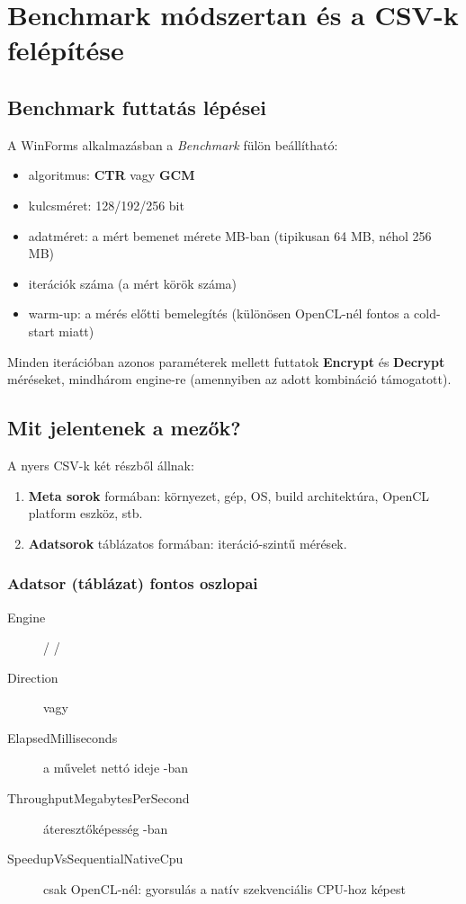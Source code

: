 \chapter{Benchmark módszertan és a CSV-k felépítése}

\section{Benchmark futtatás lépései}

A WinForms alkalmazásban a \emph{Benchmark} fülön beállítható:

\begin{itemize}
  \item algoritmus: \textbf{CTR} vagy \textbf{GCM}
  \item kulcsméret: 128/192/256 bit
  \item adatméret: a mért bemenet mérete MB-ban (tipikusan 64 MB, néhol 256 MB)
  \item iterációk száma (a mért körök száma)
  \item warm-up: a mérés előtti bemelegítés (különösen OpenCL-nél fontos a cold-start miatt)
\end{itemize}

Minden iterációban azonos paraméterek mellett futtatok \textbf{Encrypt} és \textbf{Decrypt} méréseket,
mindhárom engine-re (amennyiben az adott kombináció támogatott).

\section{Mit jelentenek a mezők?}

A nyers CSV-k két részből állnak:

\begin{enumerate}
  \item \textbf{Meta sorok}  formában:
    környezet, gép, OS, build architektúra, OpenCL platform eszköz, stb.
  \item \textbf{Adatsorok} táblázatos formában: iteráció-szintű mérések.
\end{enumerate}

\subsection{Adatsor (táblázat) fontos oszlopai}

\begin{description}
  \item[Engine]  /  / 
  \item[Direction]  vagy 
  \item[ElapsedMilliseconds] a művelet nettó ideje \ms-ban
  \item[ThroughputMegabytesPerSecond] áteresztőképesség \mbps-ban
  \item[SpeedupVsSequentialNativeCpu] csak OpenCL-nél: gyorsulás a natív szekvenciális CPU-hoz képest
\end{description}

